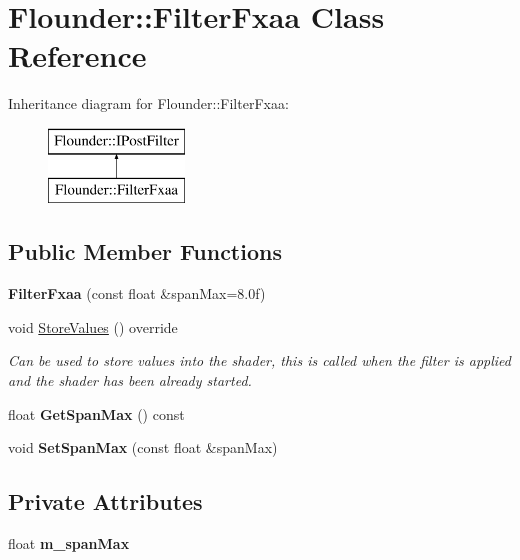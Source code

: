 \hypertarget{class_flounder_1_1_filter_fxaa}{}\section{Flounder\+:\+:Filter\+Fxaa Class Reference}
\label{class_flounder_1_1_filter_fxaa}
Inheritance diagram for Flounder\+:\+:Filter\+Fxaa\+:\begin{figure}[H]
\begin{center}
\leavevmode
\includegraphics[height=2.000000cm]{class_flounder_1_1_filter_fxaa}
\end{center}
\end{figure}
\subsection*{Public Member Functions}
\begin{DoxyCompactItemize}
\item 
\mbox{\label{class_flounder_1_1_filter_fxaa_a0910eb9fd42675f56248821b97b847e0}} 
{\bfseries Filter\+Fxaa} (const float \&span\+Max=8.\+0f)
\item 
void \hyperlink{class_flounder_1_1_filter_fxaa_a42f51b22b3a521ecdbf7dc9a2eb3ed36}{Store\+Values} () override
\begin{DoxyCompactList}\small\item\em Can be used to store values into the shader, this is called when the filter is applied and the shader has been already started. \end{DoxyCompactList}\item 
\mbox{\label{class_flounder_1_1_filter_fxaa_a5d2635db35f15e56b420c79dd3660495}} 
float {\bfseries Get\+Span\+Max} () const
\item 
\mbox{\label{class_flounder_1_1_filter_fxaa_a8a97fb848b621dfb32d3e72b02072861}} 
void {\bfseries Set\+Span\+Max} (const float \&span\+Max)
\end{DoxyCompactItemize}
\subsection*{Private Attributes}
\begin{DoxyCompactItemize}
\item 
\mbox{\label{class_flounder_1_1_filter_fxaa_a72b1e58ac85fbed819ea52517802a30e}} 
float {\bfseries m\+\_\+span\+Max}
\end{DoxyCompactItemize}
